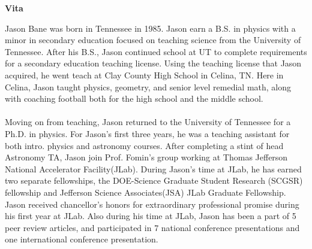 


\begin{center}
{\large \textbf{Vita}}\\
\end{center}

Jason Bane was born in Tennessee in 1985. Jason earn a B.S. in physics with a minor in secondary education focused on teaching science from the University of Tennessee. After his B.S., Jason continued school at UT to complete requirements for a secondary education teaching license. Using the teaching license that Jason acquired, he went teach at Clay County High School in Celina, TN. Here in Celina, Jason taught physics, geometry, and senior level remedial math, along with coaching football both for the high school and the middle school. 
\paragraph{}Moving on from teaching, Jason returned to the University of Tennessee for a Ph.D. in physics. For Jason's first three years, he was a teaching assistant for both intro. physics and astronomy courses. After completing a stint of head Astronomy TA, Jason join Prof. Fomin's group working at Thomas Jefferson National Accelerator Facility(JLab). During Jason's time at JLab, he has earned two separate fellowships, the DOE-Science Graduate Student Research (SCGSR) fellowship and Jefferson Science Associates(JSA) JLab Graduate Fellowship. Jason received chancellor’s honors for extraordinary professional promise during his first year at JLab.  Also during his time at JLab, Jason has been a part of 5 peer review articles, and participated in 7 national conference presentations and one international conference presentation. 





